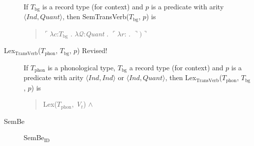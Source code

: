 \begin{description}
        If $T_{\text{bg}}$ is a record type (for context) and $p$ is a
  predicate with arity $\langle\textit{Ind},\textit{Quant}\rangle$, then SemTransVerb($T_{\mathrm{bg}}$, $p$) is
  \begin{quote}
    $\ulcorner\lambda c$:$T_{\mathrm{bg}}$ . $\lambda
    \mathcal{Q}$:\textit{Quant} . $\ulcorner\lambda
    r$:
    . $\urcorner)\urcorner$
  \end{quote}
        
\item[\textnormal{Lex$_{\mathrm{TransVerb}}$($T_{\mathrm{phon}}$,
          $T_{\mathrm{bg}}$, $p$)} Revised!] \mbox{}

        If $T_{\mathrm{phon}}$ is a phonological type,
        $T_{\mathrm{bg}}$ a record type (for context) and $p$ is a
        predicate with arity $\langle\textit{Ind},\textit{Ind}\rangle$
        or $\langle\textit{Ind},\textit{Quant}\rangle$, then Lex$_{\mathrm{TransVerb}}$($T_{\mathrm{phon}}$,
        $T_{\mathrm{bg}}$, $p$) is
        \begin{quote}
          Lex($T_{\mathrm{phon}}$, \textit{V$_t$}) \d{$\wedge$}
        \end{quote}

        

        
      \item[\textnormal{SemBe}] \mbox{}


        \begin{description}
          
        \item[\textnormal{SemBe$_{\text{ID}}$}] \mbox{}


\end{description}
\end{description}
